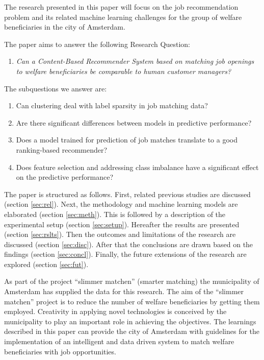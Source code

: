 The research presented in this paper will focus on the job recommendation problem and its related machine learning challenges for the group of welfare beneficiaries in the city of Amsterdam. 

The paper aims to answer the following Research Question:
\begin{enumerate}
    \item \em Can a Content-Based Recommender System based on matching job openings to welfare beneficiaries be comparable to human customer managers? \label{rq:mrq}
\end{enumerate}{}

The subquestions we answer are:
\begin{enumerate}\addtocounter{enumi}{1}
    \item Can clustering deal with label sparsity in job matching data? \label{rq:cold}
    \item Are there significant differences between models in predictive performance? \label{rq:model}
    \item Does a model trained for prediction of job matches translate to a good ranking-based recommender? \label{rq:ranking}
    \item Does feature selection and addressing class imbalance have a significant effect on the predictive performance? \label{rq:strategies}
\end{enumerate}

The paper is structured as follows. First, related previous studies are discussed (section \ref{sec:rel}). Next, the methodology and machine learning models are elaborated (section \ref{sec:meth}). This is followed by a description of the experimental setup (section \ref{sec:setup}). Hereafter the results are presented (section \ref{sec:rslts}). Then the outcomes and limitations of the research are discussed (section \ref{sec:disc}). After that the conclusions are drawn based on the findings (section \ref{sec:concl}). Finally, the future extensions of the research are explored (section \ref{sec:fut}).

As part of the project “slimmer matchen” (smarter matching) the municipality of Amsterdam has supplied the data for this research. 
The aim of the “slimmer matchen”  project is to reduce the number of welfare beneficiaries by getting them employed.
Creativity in applying novel technologies is conceived by the municipality to play an important role in achieving the objectives.
The learnings described in this paper can provide the city of Amsterdam with guidelines for the implementation of an intelligent and data driven system to match welfare beneficiaries with job opportunities. 



